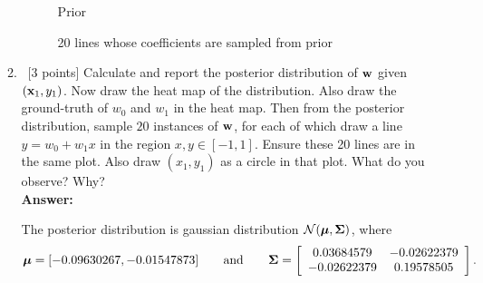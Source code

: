 \documentclass[12pt, fullpage,letterpaper]{article}
\def\red{\color{red}}
\def\blackblue{\color{black!40!blue}}
\begin{document}
\begin{enumerate}
\begin{enumerate}
{\begin{figure}[H]
\begin{center}
\begin{minipage}{0.45\textwidth}
     	\caption{{\footnotesize Prior}}\label{Fig.2}      
 	\end{minipage}
 	\begin{minipage}{0.45\textwidth}
     	\caption{{\footnotesize 20 lines whose coefficients are sampled from prior}}\label{Fig.2}      
 	\end{minipage}
	 \end{center}
	\end{figure}
	}	
		\item~[3 points] Calculate and report the posterior distribution of ${\bf w}$ given $({\bf x}_1, y_1)$. Now draw the heat map of the distribution. Also draw the ground-truth of $w_0$ and $w_1$ in the heat map.  Then from the posterior distribution, sample $20$ instances of ${\bf w}$, for each of which draw a line  $y = w_0 + w_1x$ in the region $x, y \in [-1, 1]$. Ensure these 20 lines are in the same plot. Also draw $(x_1, y_1)$ as a circle in that plot. What do you observe? Why?\\
	{\bf \red Answer:} {\blackblue 
	The posterior distribution is gaussian distribution $\mathcal{N}(\boldsymbol{\mu}, \boldsymbol{\Sigma})$, where 
	$$\boldsymbol{\mu} =  [-0.09630267, -0.01547873]\quad\quad\text{and}\quad \quad \boldsymbol{\Sigma} = \left[\begin{array}{cc}0.03684579 & -0.02622379\\
	-0.02622379 & 0.19578505
	\end{array}\right].$$
	
}
\end{enumerate}
\end{enumerate}
\end{document}
